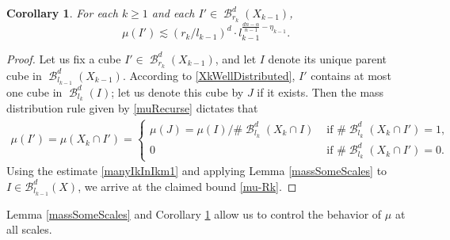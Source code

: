 \documentclass[dvipsnames,letterpaper,12pt]{article}
\numberwithin{equation}{section}
\theoremstyle{plain}
\newtheorem{corollary}{Corollary}
\theoremstyle{remark}
\DeclareMathOperator{\B}{\mathcal{B}}
\begin{document}
\begin{corollary}\label{muAtScaleRk}
	For each $k\geq 1$ and each $I' \in \B^d_{r_k} (X_{k-1})$, 
	\begin{equation} 
	\mu(I') \lesssim (r_k/l_{k-1})^d \cdot l_{k-1}^{\frac{dn-\alpha}{n-1}-\eta_{k-1}}. \label{mu-Rk}
	\end{equation} 
\end{corollary}
\begin{proof}
Let us fix a cube $I' \in \B^d_{r_k}(X_{k-1})$, and let $I$ denote its unique parent cube in $\B_{l_{k-1}}^d (X_{k-1})$. According to \eqref{XkWellDistributed}, $I'$ contains at most one cube in $\B_{l_k}^d(I)$; let us denote this cube by $J$ if it exists. Then the mass distribution rule given by \eqref{muRecurse} dictates that 
\begin{align*}
\mu(I') = \mu(X_k \cap I') = \begin{cases} \mu(J) = {\mu(I)}/{\# \B_{l_k}^d(X_k \cap I)}  &\text{ if } \# \B_{l_k}^d(X_k \cap I') = 1, \\ 0 &\text{ if } \# \B_{l_k}^d(X_k \cap I') = 0. \end{cases} 
\end{align*} 
Using the estimate \eqref{manyIkInIkm1} and applying Lemma \ref{massSomeScales} to $I \in \mathcal B_{l_{k-1}}^d(X)$, we arrive at the claimed bound \eqref{mu-Rk}. 
\end{proof}
Lemma \ref{massSomeScales} and Corollary \ref{muAtScaleRk} allow us to control the behavior of $\mu$ at all scales. %
\end{document}

